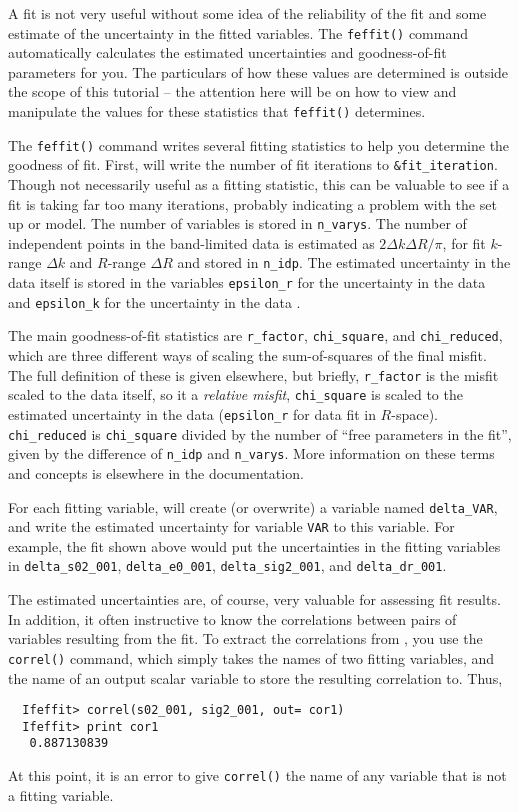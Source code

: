 \documentclass[11pt]{article}
\begin{document}
A fit is not very useful without some idea of the reliability of the fit
and some estimate of the uncertainty in the fitted variables.  The
{\tt{feffit()}} command automatically calculates the estimated
uncertainties and goodness-of-fit parameters for you.  The particulars of
how these values are determined is outside the scope of this tutorial --
the attention here will be on how to view and manipulate the values for
these statistics that {\tt{feffit()}} determines.

The {\tt{feffit()}} command writes several fitting statistics to help you
determine the goodness of fit.  First, {\ifeffit} will write the number of
fit iterations to {\tt{\&fit\_iteration}}.  Though not necessarily useful
as a fitting statistic, this can be valuable to see if a fit is taking far
too many iterations, probably indicating a problem with the set up or
model.  The number of variables is stored in {\tt{n\_varys}}.  The number
of independent points in the band-limited data is estimated as $ { {2
    \Delta k \Delta R}/\pi } $, for fit $k$-range $\Delta k$ and $R$-range
$\Delta R$ and stored in {\tt{n\_idp}}.  The estimated uncertainty in the
data itself is stored in the variables {\tt{epsilon\_r}} for the
uncertainty in the data {\chir} and {\tt{epsilon\_k}} for the uncertainty
in the data {\chik}.


The main goodness-of-fit statistics are {\tt{r\_factor}},
{\tt{chi\_square}}, and {\tt{chi\_reduced}}, which are three different ways
of scaling the sum-of-squares of the final misfit.  The full definition of
these is given elsewhere, but briefly, {\tt{r\_factor}} is the misfit
scaled to the data itself, so it a {\emph{relative misfit}},
{\tt{chi\_square}} is scaled to the estimated uncertainty in the data
({\tt{epsilon\_r}} for data fit in $R$-space).  {\tt{chi\_reduced}} is
{\tt{chi\_square}} divided by the number of ``free parameters in the fit'',
given by the difference of {\tt{n\_idp}} and {\tt{n\_varys}}.  More
information on these terms and concepts is elsewhere in the {\ifeffit}
documentation.

For each fitting variable, {\ifeffit} will create (or overwrite) a variable
named {\tt{delta\_VAR}}, and write the estimated uncertainty for variable
{\tt{VAR}} to this variable.  For example, the fit shown above would put
the uncertainties in the fitting variables in {\tt{delta\_s02\_001}},
{\tt{delta\_e0\_001}}, {\tt{delta\_sig2\_001}}, and {\tt{delta\_dr\_001}}.

The estimated uncertainties are, of course, very valuable for assessing fit
results.  In addition, it often instructive to know the correlations
between pairs of variables resulting from the fit.  To extract the
correlations from {\ifeffit}, you use the {\tt{correl()}} command, which
simply takes the names of two fitting variables, and the name of an output
scalar variable to store the resulting correlation to.  Thus,
{\small\begin{verbatim}
  Ifeffit> correl(s02_001, sig2_001, out= cor1)
  Ifeffit> print cor1
   0.887130839 
\end{verbatim}}\noindent
\noindent
At this point, it is an error to give {\tt{correl()}} the name of any
variable that is not a fitting variable. 
\end{document}
